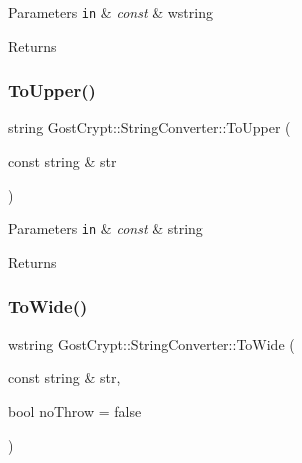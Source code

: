 \begin{DoxyParams}[1]{Parameters}
\mbox{\tt in}  & {\em const} & wstring \\
\hline
\end{DoxyParams}
\begin{DoxyReturn}{Returns}

\end{DoxyReturn}
\mbox{\label{class_gost_crypt_1_1_string_converter_a52abce3a067b2fb0dfedcc7cc31206fc}} 
\subsubsection{\texorpdfstring{To\+Upper()}{ToUpper()}}
{\footnotesize\ttfamily string Gost\+Crypt\+::\+String\+Converter\+::\+To\+Upper (\begin{DoxyParamCaption}\item[{const string \&}]{str }\end{DoxyParamCaption})\hspace{0.3cm}{\ttfamily [static]}}


\begin{DoxyParams}[1]{Parameters}
\mbox{\tt in}  & {\em const} & string \\
\hline
\end{DoxyParams}
\begin{DoxyReturn}{Returns}

\end{DoxyReturn}
\mbox{\label{class_gost_crypt_1_1_string_converter_a3dd380a8d6cd73590b632520ecbf13e1}} 
\subsubsection{\texorpdfstring{To\+Wide()}{ToWide()}}
{\footnotesize\ttfamily wstring Gost\+Crypt\+::\+String\+Converter\+::\+To\+Wide (\begin{DoxyParamCaption}\item[{const string \&}]{str,  }\item[{bool}]{no\+Throw = {\ttfamily false} }\end{DoxyParamCaption})\hspace{0.3cm}{\ttfamily [static]}}


